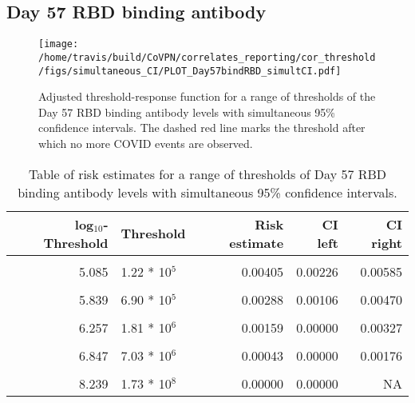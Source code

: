 \documentclass[]{book}
\theoremstyle{definition}
\theoremstyle{definition}
\theoremstyle{definition}
\newcommand{\1}{\mathbbm{1}}
\begin{document}
\clearpage

\clearpage

\clearpage

\hypertarget{day-57-rbd-binding-antibody-2}{%
\subsection{Day 57 RBD binding antibody}\label{day-57-rbd-binding-antibody-2}}

\begin{figure}[H]
\centering
\texttt{[image: /home/travis/build/CoVPN/correlates\_reporting/cor\_threshold/figs/simultaneous\_CI/PLOT\_Day57bindRBD\_simultCI.pdf]}
\caption{Adjusted threshold-response function for a range of thresholds of the
  Day 57 RBD binding antibody levels with simultaneous 95\% confidence intervals. The dashed red line marks the threshold after which no more COVID events are observed. }
\end{figure}
\begin{table}[!h]

\caption{\label{tab:unnamed-chunk-381}Table of risk estimates for a range of thresholds of Day 57 RBD binding antibody levels with simultaneous 95\% confidence intervals.}
\centering
\begin{tabular}[t]{rlrrr}
\toprule
log$_{10}$-Threshold & Threshold & Risk estimate & CI left & CI right\\
\midrule
\cellcolor{gray!6}{4.062} & \cellcolor{gray!6}{1.15 * 10$^4$} & \cellcolor{gray!6}{0.00490} & \cellcolor{gray!6}{0.00302} & \cellcolor{gray!6}{0.00677}\\
5.085 & 1.22 * 10$^5$ & 0.00405 & 0.00226 & 0.00585\\
\cellcolor{gray!6}{5.507} & \cellcolor{gray!6}{3.21 * 10$^5$} & \cellcolor{gray!6}{0.00377} & \cellcolor{gray!6}{0.00188} & \cellcolor{gray!6}{0.00565}\\
5.839 & 6.90 * 10$^5$ & 0.00288 & 0.00106 & 0.00470\\
\cellcolor{gray!6}{6.048} & \cellcolor{gray!6}{1.12 * 10$^6$} & \cellcolor{gray!6}{0.00238} & \cellcolor{gray!6}{0.00056} & \cellcolor{gray!6}{0.00420}\\
6.257 & 1.81 * 10$^6$ & 0.00159 & 0.00000 & 0.00327\\
\cellcolor{gray!6}{6.499} & \cellcolor{gray!6}{3.16 * 10$^6$} & \cellcolor{gray!6}{0.00131} & \cellcolor{gray!6}{0.00000} & \cellcolor{gray!6}{0.00310}\\
6.847 & 7.03 * 10$^6$ & 0.00043 & 0.00000 & 0.00176\\
\cellcolor{gray!6}{7.181} & \cellcolor{gray!6}{1.52 * 10$^7$} & \cellcolor{gray!6}{0.00087} & \cellcolor{gray!6}{0.00000} & \cellcolor{gray!6}{0.00365}\\
8.239 & 1.73 * 10$^8$ & 0.00000 & 0.00000 & NA\\
\bottomrule
\end{tabular}
\end{table}
\end{document}
